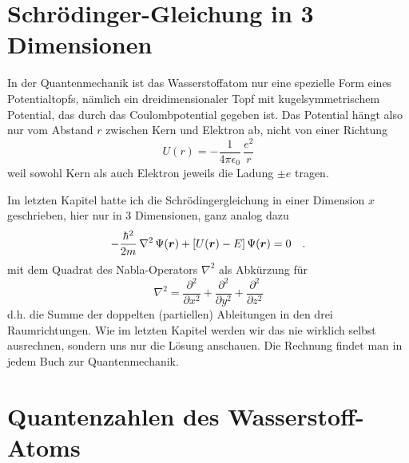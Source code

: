 \section{Schrödinger-Gleichung in 3 Dimensionen}
In der Quantenmechanik ist das Wasserstoffatom nur eine spezielle Form eines Potentialtopfs, nämlich ein dreidimensionaler Topf mit kugelsymmetrischem Potential, das durch das Coulombpotential gegeben ist. Das Potential hängt also nur vom Abstand $r$ zwischen Kern und Elektron ab, nicht von einer Richtung
\begin{equation}
    U(r) = - \frac{1}{4 \pi \epsilon_0} \, \frac{e^2}{r}
\end{equation}
weil sowohl Kern als auch Elektron jeweils die Ladung $\pm e$ tragen.

Im letzten Kapitel hatte ich die Schrödingergleichung in einer Dimension $x$ geschrieben, hier nur in 3 Dimensionen, ganz analog dazu
\begin{equation}
    - \frac{\hbar^2}{2m} \,\nabla^2 \, \Psi(\boldsymbol{r}) + \left[ U(\boldsymbol{r}) - E \right] \Psi(\boldsymbol{r}) = 0 \quad .
    \label{eq:5_SG_3d}
  \end{equation}
mit dem Quadrat des Nabla-Operators $\nabla^2$ als Abkürzung für
\begin{equation}
    \nabla^2 = \frac{\partial^2}{\partial x^2 } + \frac{\partial^2}{\partial y^2 } + 
    \frac{\partial^2}{\partial z^2 } 
\end{equation}
d.h. die Summe der doppelten (partiellen) Ableitungen in den drei Raumrichtungen. Wie im letzten Kapitel werden wir das nie wirklich selbst ausrechnen, sondern uns nur die Lösung anschauen. Die Rechnung findet man in jedem Buch zur Quantenmechanik.

\section{Quantenzahlen des Wasserstoff-Atoms}

